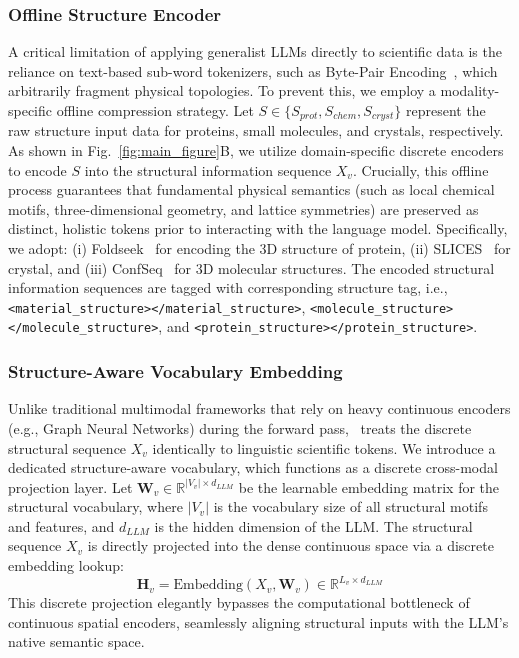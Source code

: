 \subsubsection{Offline Structure Encoder}
A critical limitation of applying generalist LLMs directly to scientific data is the reliance on text-based sub-word tokenizers, such as Byte-Pair Encoding~\citep{sennrich2016neural,gage1994new}, which arbitrarily fragment physical topologies. 
To prevent this, we employ a modality-specific offline compression strategy. Let $S \in \{S_{prot}, S_{chem}, S_{cryst}\}$ represent the raw structure input data for proteins, small molecules, and crystals, respectively. As shown in Fig.~\ref{fig:main_figure}B, we utilize domain-specific discrete encoders to encode $S$ into the structural information sequence $X_v$. Crucially, this offline process guarantees that fundamental physical semantics (such as local chemical motifs, three-dimensional geometry, and lattice symmetries) are preserved as distinct, holistic tokens prior to interacting with the language model. 
Specifically, we adopt: (i) Foldseek~\citep{van2024fast} for encoding the 3D structure of protein, (ii) SLICES~\citep{xiao2023invertible} for crystal, and (iii) ConfSeq~\citep{xiong2025bridging} for 3D molecular structures. 
The encoded structural information sequences are tagged with corresponding structure tag, i.e., \texttt{<material\_structure></material\_structure>},  \texttt{<molecule\_structure></molecule\_structure>},  and \texttt{<protein\_structure></protein\_structure>}. 

\subsubsection{Structure-Aware Vocabulary Embedding}
Unlike traditional multimodal frameworks that rely on heavy continuous encoders (e.g., Graph Neural Networks) during the forward pass, \projName~treats the discrete structural sequence $X_v$ identically to linguistic scientific tokens. We introduce a dedicated structure-aware vocabulary, which functions as a discrete cross-modal projection layer. Let $\mathbf{W}_v \in \mathbb{R}^{|V_v| \times d_{LLM}}$ be the learnable embedding matrix for the structural vocabulary, where $|V_v|$ is the vocabulary size of all structural motifs and features, and $d_{LLM}$ is the hidden dimension of the LLM. 
The structural sequence $X_v$ is directly projected into the dense continuous space via a discrete embedding lookup: 
\begin{equation}
    \mathbf{H}_v = \text{Embedding}(X_v, \mathbf{W}_v) \in \mathbb{R}^{L_v \times d_{LLM}}
\end{equation}
This discrete projection elegantly bypasses the computational bottleneck of continuous spatial encoders, seamlessly aligning structural inputs with the LLM's native semantic space. 


